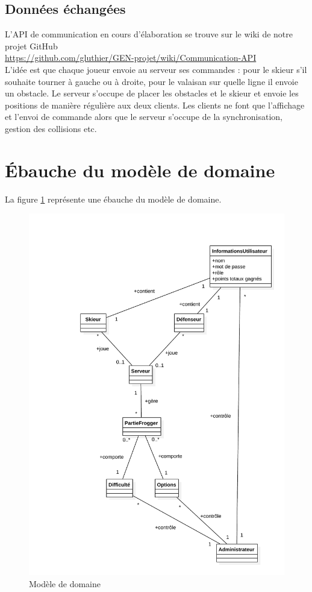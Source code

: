 \documentclass[a4paper,11pt]{article}
\begin{document}
		\subsection{Données échangées}
			L'API de communication en cours d'élaboration se trouve sur le wiki de notre projet GitHub \\ \url{https://github.com/gluthier/GEN-projet/wiki/Communication-API} \\
			L'idée est que chaque joueur envoie au serveur ses commandes : pour le skieur s'il souhaite tourner à gauche ou à droite, pour le valaisan sur quelle ligne il envoie un obstacle. Le serveur s'occupe de placer les obstacles et le skieur et envoie les positions de manière régulière aux deux clients. Les clients ne font que l'affichage et l'envoi de commande alors que le serveur s'occupe de la synchronisation, gestion des collisions etc.

	\section{Ébauche du modèle de domaine}
	La figure \ref{model_domain} représente une ébauche du modèle de domaine.

	\begin{figure}[!ht]
		\centering
		\includegraphics[scale=0.6]{../Schemas/model_domain.pdf}
		\caption{Modèle de domaine}
		\label{model_domain}
	\end{figure}
\end{document}
